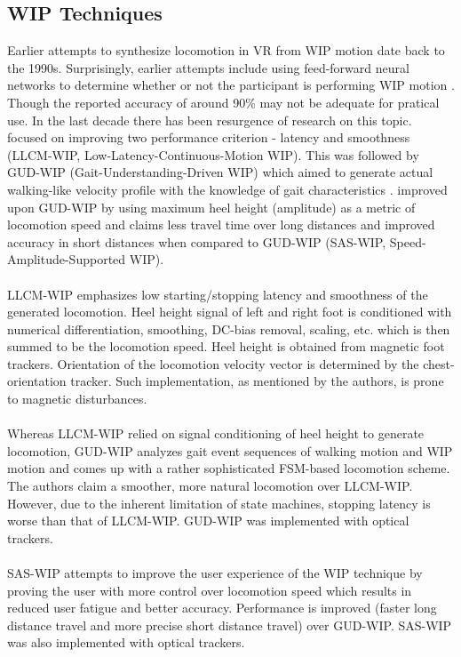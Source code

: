 \newpage

\subsection{WIP Techniques}
Earlier attempts to synthesize locomotion in VR from WIP motion date back to the 1990s. Surprisingly, earlier attempts include using feed-forward neural networks to determine whether or not the participant is performing WIP motion  \citep{Sla95}. Though the reported accuracy of around 90\% may not be adequate for pratical use. In the last decade there has been resurgence of research on this topic. \cite{Fea08} focused on improving two performance criterion - latency and smoothness (LLCM-WIP, Low-Latency-Continuous-Motion WIP). This was followed by GUD-WIP (Gait-Understanding-Driven WIP) which aimed to generate actual walking-like velocity profile with the knowledge of gait characteristics \citep{Wen10}. \cite{Bru13} improved upon GUD-WIP by using maximum heel height (amplitude) as a metric of locomotion speed and claims less travel time over long distances and improved accuracy in short distances when compared to GUD-WIP (SAS-WIP, Speed-Amplitude-Supported WIP).
\\\\
LLCM-WIP emphasizes low starting/stopping latency and smoothness of the generated locomotion. Heel height signal of left and right foot is conditioned with numerical differentiation, smoothing, DC-bias removal, scaling, etc. which is then summed to be the locomotion speed. Heel height is obtained from magnetic foot trackers. Orientation of the locomotion velocity vector is determined by the chest-orientation tracker. Such implementation, as mentioned by the authors, is prone to magnetic disturbances.
\\\\
Whereas LLCM-WIP relied on signal conditioning of heel height to generate locomotion, GUD-WIP analyzes gait event sequences of walking motion and WIP motion and comes up with a rather sophisticated FSM-based locomotion scheme. The authors claim a smoother, more natural locomotion over LLCM-WIP. However, due to the inherent limitation of state machines, stopping latency is worse than that of LLCM-WIP. GUD-WIP was implemented with optical trackers.
\\\\
SAS-WIP attempts to improve the user experience of the WIP technique by proving the user with more control over locomotion speed which results in reduced user fatigue and better accuracy. Performance is improved (faster long distance travel and more precise short distance travel) over GUD-WIP. SAS-WIP was also implemented with optical trackers.
